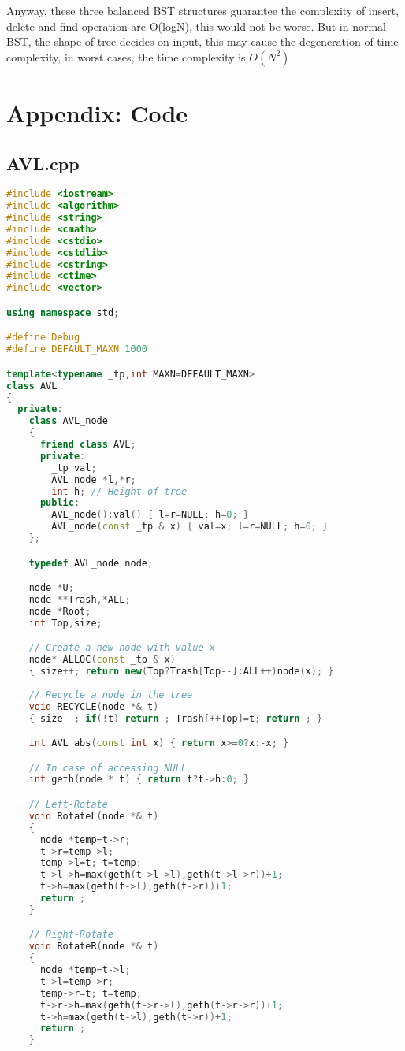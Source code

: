 \documentclass[UTF8]{report}
\numberwithin{figure}{subsection}
\numberwithin{table}{subsection}
\begin{document}
Anyway, these three balanced BST structures guarantee the complexity of insert, delete
and find operation are O(logN), this would not be worse. But in normal BST, 
the shape of tree decides on input, this may cause the degeneration of time complexity,
in worst cases, the time complexity is $O(N^2)$.

\chapter{Appendix: Code}
\section{AVL.cpp}
\begin{lstlisting}[language=c++]
#include <iostream>
#include <algorithm>
#include <string>
#include <cmath>
#include <cstdio>
#include <cstdlib>
#include <cstring>
#include <ctime>
#include <vector>

using namespace std;

#define Debug
#define DEFAULT_MAXN 1000

template<typename _tp,int MAXN=DEFAULT_MAXN>
class AVL
{
  private:
    class AVL_node
    {
      friend class AVL;
      private:
        _tp val;
        AVL_node *l,*r;
        int h; // Height of tree
      public:
        AVL_node():val() { l=r=NULL; h=0; }
        AVL_node(const _tp & x) { val=x; l=r=NULL; h=0; }
    };

    typedef AVL_node node;

    node *U;
    node **Trash,*ALL;
    node *Root;
    int Top,size;

    // Create a new node with value x
    node* ALLOC(const _tp & x)
    { size++; return new(Top?Trash[Top--]:ALL++)node(x); }
    
    // Recycle a node in the tree
    void RECYCLE(node *& t)
    { size--; if(!t) return ; Trash[++Top]=t; return ; }

    int AVL_abs(const int x) { return x>=0?x:-x; }

    // In case of accessing NULL
    int geth(node * t) { return t?t->h:0; }

    // Left-Rotate
    void RotateL(node *& t)
    {
      node *temp=t->r;
      t->r=temp->l;
      temp->l=t; t=temp;
      t->l->h=max(geth(t->l->l),geth(t->l->r))+1;
      t->h=max(geth(t->l),geth(t->r))+1;
      return ;
    }

    // Right-Rotate
    void RotateR(node *& t)
    {
      node *temp=t->l;
      t->l=temp->r;
      temp->r=t; t=temp;
      t->r->h=max(geth(t->r->l),geth(t->r->r))+1;
      t->h=max(geth(t->l),geth(t->r))+1;
      return ;
    }


\end{lstlisting}
\end{document}

